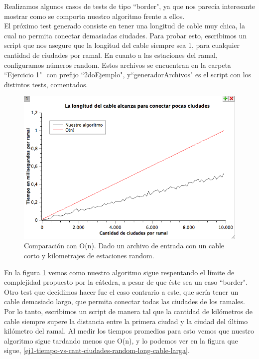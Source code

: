 Realizamos algunos casos de tests de tipo ``border", ya que nos parecía interesante mostrar como se comporta nuestro algoritmo frente a ellos.\\

El próximo test generado consiste en tener una longitud de cable muy chica, la cual no permita conectar demasiadas ciudades. Para probar esto, escribimos un script que nos asegure que la longitud del cable siempre sea 1, para cualquier cantidad de ciudades por ramal. En cuanto a las estaciones del ramal, configuramos números random. Estos archivos se encuentran en la carpeta ``Ejercicio 1" $ $ con prefijo ``2doEjemplo", y``generadorArchivos" $ $es el script con los distintos tests, comentados. \\

\begin{figure}[H]
\begin{center}

  \includegraphics[width=\linewidth]{../graficos/ej1/CableCorto.png}
  \caption{{\small Comparación con O(n). Dado un archivo de entrada con un cable corto y kilometrajes de estaciones random.}} \label{ej1-tiempo-vs-cant-ciudades-random-long-cable-1}
\endminipage

\end{center}
\end{figure}

En la figura \ref{ej1-tiempo-vs-cant-ciudades-random-long-cable-1} vemos como nuestro algoritmo sigue respentando el límite de complejidad propuesto por la cátedra, a pesar de que éste sea un caso ``border". \\

Otro test que decidimos hacer fue el caso contrario a este, que sería tener un cable demasiado largo, que permita conectar todas las ciudades de los ramales. Por lo tanto, escribimos un script de manera tal que la cantidad de kilómetros de cable siempre supere la distancia entre la primera ciudad y la ciudad del último kilómetro del ramal. Al medir los tiempos promedios para esto vemos que nuestro algoritmo sigue tardando menos que O(n), y lo podemos ver en la figura que sigue, \ref{ej1-tiempo-vs-cant-ciudades-random-long-cable-larga}. \\

